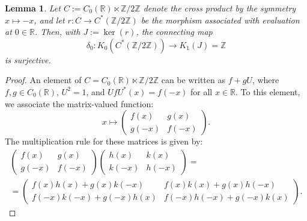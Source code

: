 \documentclass[letterpaper,11pt]{article}
\def\R{\mathbb{R}}
\def\Z{\mathbb{Z}}
\theoremstyle{plain}
\newtheorem{lem}[thm]{Lemma}
\begin{document}
\begin{lem}\label{connecting} Let $ C := C_0(\R) \ltimes \Z/2\Z $ denote the cross product by the symmetry $ x \mapsto -x $, and let $ r: C \to C^*(\Z/2\Z) $ be the morphism associated with evaluation at $ 0 \in \R $. Then, with $ J := \ker(r) $, the connecting map  
\[
\delta_0: K_0(C^*(\Z/2\Z)) \to K_1(J) = \Z  
\]  
is surjective. 
\end{lem}


 \begin{proof}
    An element of $ C = C_0(\mathbb{R}) \ltimes \mathbb{Z}/2\mathbb{Z} $ can be written as $ f + gU $, where $ f, g \in C_0(\mathbb{R}) $, $ U^2 = 1 $, and $ UfU^*(x) = f(-x) $ for all $ x \in \mathbb{R} $. To this element, we associate the matrix-valued function:  
\[
x \mapsto 
\begin{pmatrix}
f(x) & g(x) \\
g(-x) & f(-x)
\end{pmatrix}.
\]
The multiplication rule for these matrices is given by:  
\begin{multline*}
\begin{pmatrix}
f(x) & g(x) \\
g(-x) & f(-x)
\end{pmatrix}\begin{pmatrix}
h(x) & k(x) \\
k(-x) & h(-x)
\end{pmatrix}
= \\
=\begin{pmatrix}
f(x)h(x) + g(x)k(-x) & f(x)k(x) + g(x)h(-x) \\
f(-x)k(-x) + g(-x)h(x) & f(-x)h(-x) + g(-x)k(x)
\end{pmatrix}.
\end{multline*}


\end{proof}
\end{document}
